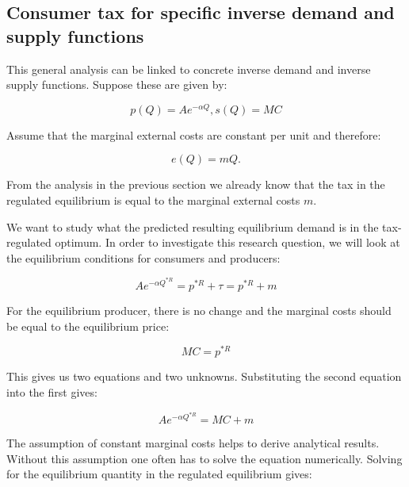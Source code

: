 \documentclass[
]{book}
\begin{document}
\hypertarget{consumer-tax-for-specific-inverse-demand-and-supply-functions}{%
\subsection{Consumer tax for specific inverse demand and supply functions}\label{consumer-tax-for-specific-inverse-demand-and-supply-functions}}

This general analysis can be linked to concrete inverse demand and inverse supply functions. Suppose these are given by:

\begin{equation}
p(Q) = A e^{-\alpha Q}, s(Q) = MC
\end{equation}

Assume that the marginal external costs are constant per unit and therefore:

\begin{equation}
e(Q)=mQ.
\end{equation}

From the analysis in the previous section we already know that the tax in the regulated equilibrium is equal to the marginal external costs \(m\).

We want to study what the predicted resulting equilibrium demand is in the tax-regulated optimum. In order to investigate this research question, we will look at the equilibrium conditions for consumers and producers:

\begin{equation}
A e^{-\alpha Q^{* R}} = p^{* R} + \tau = p^{* R} + m
\end{equation}

For the equilibrium producer, there is no change and the marginal costs should be equal to the equilibrium price:

\begin{equation}
MC = p^{* R}
\end{equation}

This gives us two equations and two unknowns. Substituting the second equation into the first gives:

\begin{equation}
A e^{-\alpha Q^{* R}}  = MC + m
\end{equation}

The assumption of constant marginal costs helps to derive analytical results. Without this assumption one often has to solve the equation numerically. Solving for the equilibrium quantity in the regulated equilibrium gives:
\end{document}
